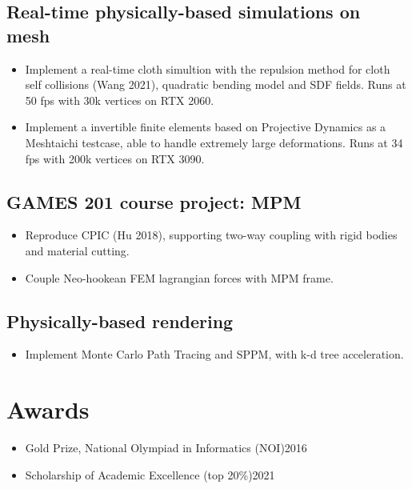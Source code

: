 \documentclass{resume}
\begin{document}
\subsection{\textbf{Real-time physically-based simulations on mesh}}
\begin{itemize}
  \item Implement a real-time cloth simultion with the repulsion method for cloth self collisions (Wang 2021), quadratic bending model and SDF fields.
        Runs at 50 fps with 30k vertices on RTX 2060.
  \item Implement a invertible finite elements based on Projective Dynamics as a Meshtaichi testcase, able to handle extremely large deformations.
        Runs at 34 fps with 200k vertices on RTX 3090.

\end{itemize}

\subsection{\textbf{GAMES 201 course project: MPM}}
\begin{itemize}
  \item Reproduce CPIC (Hu 2018), supporting two-way coupling with rigid bodies and material cutting.
  \item Couple Neo-hookean FEM lagrangian forces with MPM frame.
\end{itemize}

\subsection{\textbf{Physically-based rendering}}
\begin{itemize}
  \item Implement Monte Carlo Path Tracing and SPPM, with k-d tree acceleration.
\end{itemize}

\section{Awards}
\begin{itemize}
  \item Gold Prize, National Olympiad in Informatics (NOI)\hfill 2016
  \item Scholarship of Academic Excellence (top 20\%)\hfill 2021
\end{itemize}
\end{document}

